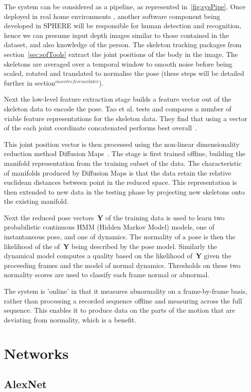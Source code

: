 \documentclass[11pt]{article} %
\begin{document}
\begin{appendices}
The system can be considered as a pipeline, as represented in~\ref{fig:sysPipe}. Once deployed in real home environments , another software component being developed in SPHERE will be responsible for human detection and recognition, hence we can presume input depth images similar to those contained in the dataset, and also knowledge of the person. The skeleton tracking packages from section~\ref{sec:sofTools} extract the joint positions of the body in the image. The skeletons are averaged over a temporal window to smooth noise before being scaled, rotated and translated to normalise the pose (these steps will be detailed further in section$^{insert reference later}$).  

Next the low-level feature extraction stage builds a feature vector out of the skeleton data to encode the pose. Tao et al. tests and compares a number of viable feature representations for the skeleton data. They find that using a vector of the each joint coordinate concatenated performs best overall~\cite{Tao}. 

This joint position vector is then processed using the non-linear dimensionality reduction method Diffusion Maps~\cite{Coifman2006}. The stage is first trained offline, building the manifold representation from the training subset of the data. The characteristic of manifolds produced by Diffusion Maps is that the data retain the relative euclidean distances between point in the reduced space. This representation is then extended to new data in the testing phase by projecting new skeletons onto the existing manifold. 

Next the reduced pose vectors~\textbf{Y} of the training data is used to learn two probabilistic continuous HMM (Hidden Markov Model) models, one of instantaneous pose, and one of dynamics. The normality of a pose is then the likelihood of the of~\textbf{Y} being described by the pose model. Similarly the dynamical model computes a quality based on the likelihood of~\textbf{Y} given the proceeding frames and the model of normal dynamics. Thresholds on these two normality scores are used to classify each frame normal or abnormal.

The system is 'online' in that it measures abnormality on a frame-by-frame basis, rather than processing a recorded sequence offline and measuring across the full sequence. This enables it to produce data on the parts of the motion that are deviating from normality, which is a benefit.




\section{Networks}
\label{sec:networkCodes}

\subsection{AlexNet}

\end{appendices}
\end{document}
